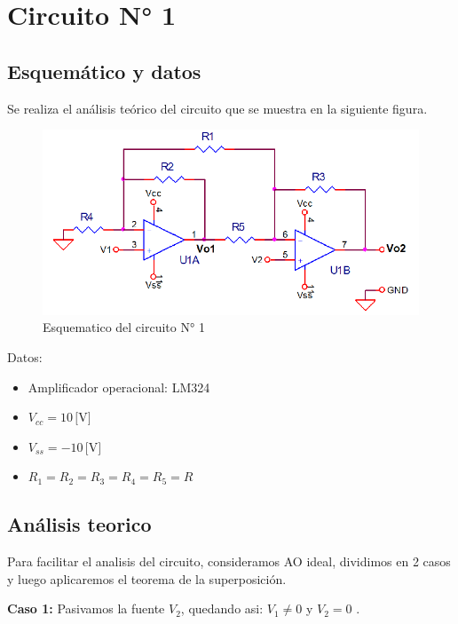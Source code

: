 \section{Circuito N° 1}



\subsection{Esquemático y datos}

Se realiza el análisis teórico del circuito que se muestra en la siguiente figura. 
 

\begin{figure}[h!]
    \centering
    \includegraphics[width=0.80\linewidth]{Secciones/Circuito1/esquematico.png}
    \caption{Esquematico del circuito N° 1}
    \label{fig:esquematico}
\end{figure}

Datos:

\begin{itemize}
  \item Amplificador operacional: LM324
  \item $V_{cc} = 10 \, \text{[V]}$
  \item $V_{ss} = -10 \, \text{[V]}$
  \item $R_1 = R_2 = R_3 = R_4 = R_5 = R$
\end{itemize}

\subsection{Análisis teorico}
Para facilitar el analisis del circuito, consideramos AO ideal, dividimos en 2 casos y luego aplicaremos el teorema de la superposición.

\vspace{1em}

\textbf{Caso 1:} Pasivamos la fuente $V_2$, quedando asi: $V_1 \neq 0 $ y $V_2 = 0$ .

\vspace{1em}

